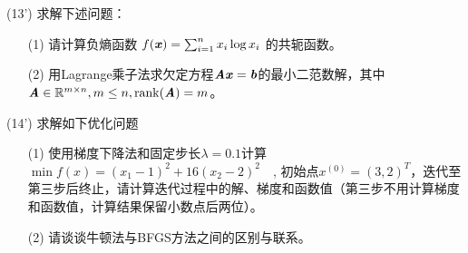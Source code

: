 \documentclass[12pt,a4paper,openany,twoside]{ctexbook}
\begin{document}
\begin{exercise}(13')
	求解下述问题：
	\begin{itemize}
		\item[(1)] 请计算负熵函数 $f(\boldsymbol{\mathit{x}})=\sum_{i=1}^{n} x_i \log x_i$ 的共轭函数。
		
		
		\item [(2)] 用Lagrange乘子法求欠定方程$ \boldsymbol{\mathit{A}}\boldsymbol{\mathit{x}}=\boldsymbol{\mathit{b}} $的最小二范数解，其中$ \boldsymbol{\mathit{A}}\in\mathbb{R}^{m\times n},m\leq n,\mathop{\rm rank}\nolimits(\boldsymbol{\mathit{A}})=m $。
	\end{itemize}
\end{exercise}
%	
%	
%	

\begin{exercise}(14')
	求解如下优化问题
	\begin{itemize}
		\item [(1)] 使用梯度下降法和固定步长$\lambda =0.1$计算$\min f(x)=(x_{1}-1)^{2}+16(x_{2}-2)^{2} \quad $, 初始点$x^{(0)}=(3,2)^{T}$，迭代至第三步后终止，请计算迭代过程中的解、梯度和函数值（第三步不用计算梯度和函数值，计算结果保留小数点后两位）。
		\item[(2)] 请谈谈牛顿法与BFGS方法之间的区别与联系。
	\end{itemize}
\end{exercise}
\end{document}

